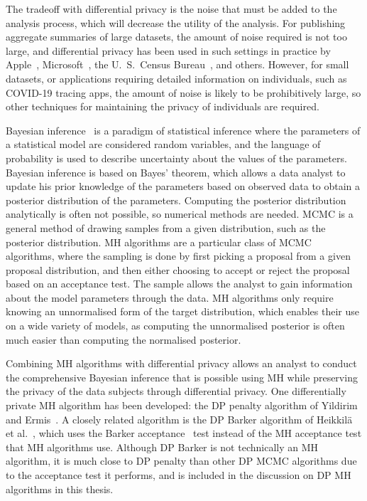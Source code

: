 \documentclass[english,twoside,openright]{HYgraduMLDS}
\begin{document}
The tradeoff with differential privacy is the noise that must be added to the
analysis process, which will decrease the utility of the analysis. For publishing
aggregate summaries of large datasets, the amount of noise required is not too
large, and differential privacy has been used in such settings in practice by
Apple~\cite{App17}, Microsoft~\cite{DKY17}, the U.\ S.\ Census Bureau~\cite{Abo18},
and others. However, for small datasets, or applications requiring detailed
information on individuals, such as COVID-19 tracing apps, the amount of
noise is likely to be prohibitively large, so other techniques for maintaining
the privacy of individuals are required.

Bayesian inference~\cite{BDA} is a paradigm of statistical inference where
the parameters of a statistical model are considered random variables, and
the language of probability is used to describe uncertainty about the values of the
parameters. Bayesian inference is based on Bayes' theorem, which allows
a data analyst to update his prior knowledge of the parameters based on observed
data to obtain a posterior distribution of the parameters.
Computing the posterior distribution analytically is often not possible,
so numerical methods are needed. MCMC is a general
method of drawing samples from a given distribution, such as the
posterior distribution. MH algorithms are a particular class
of MCMC algorithms, where
the sampling is done by first picking a proposal from a given proposal distribution,
and then either choosing to accept or reject the proposal based on an acceptance
test. The sample allows
the analyst to gain information about the model parameters through the data.
MH algorithms only require knowing an unnormalised form of the target distribution,
which enables their use on a wide variety of models, as computing the unnormalised
posterior is often much easier than computing the normalised posterior.

Combining MH algorithms with differential privacy allows
an analyst to conduct the comprehensive Bayesian inference that is
possible using MH while preserving the privacy of the data subjects through
differential privacy. One differentially private MH algorithm has been
developed: the DP penalty algorithm of Yildirim and Ermis~\cite{YildirimE19}.
A closely related algorithm is the DP Barker algorithm of
Heikkilä et al.~\cite{HeikkilaJDH19}, which uses the Barker
acceptance~\cite{Barker65} test instead of the MH acceptance test
that MH algorithms use. Although DP Barker is not technically an MH algorithm,
it is much close to DP penalty than other DP MCMC algorithms due to the
acceptance test it performs, and is included in the discussion on DP MH
algorithms in this thesis.
\end{document}
